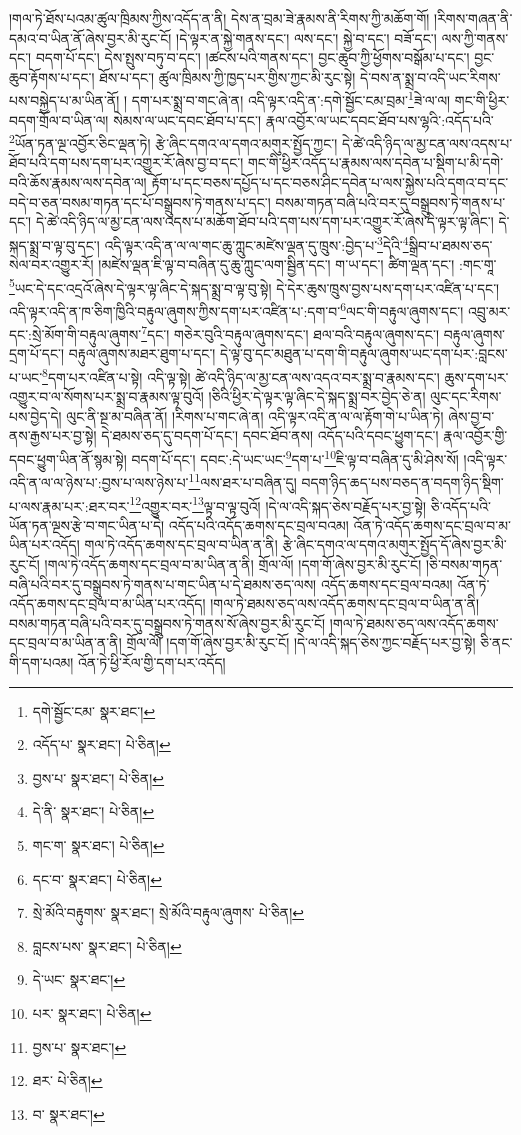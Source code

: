 །གལ་ཏེ་ཐོས་པའམ་ཚུལ་ཁྲིམས་ཀྱིས་འདོད་ན་ནི། དེས་ན་བྲམ་ཟེ་རྣམས་ནི་རིགས་ཀྱི་མཆོག་གོ། །རིགས་གཞན་ནི་དམའ་བ་ཡིན་ནོ་ཞེས་བྱར་མི་རུང་ངོ། །དེ་ལྟར་ན་སྐྱེ་གནས་དང་། ལས་དང་། སྐྱེ་བ་དང་། བཟོ་དང་། ལས་ཀྱི་གནས་དང་། བདག་པོ་དང་། དེས་སྤུས་བཏུ་བ་དང་། །ཚངས་པའི་གནས་དང་། བྱང་ཆུབ་ཀྱི་ཕྱོགས་བསྒོམ་པ་དང་། བྱང་ཆུབ་རྟོགས་པ་དང་། ཐོས་པ་དང་། ཚུལ་ཁྲིམས་ཀྱི་ཁྱད་པར་གྱིས་ཀྱང་མི་རུང་སྟེ། དེ་བས་ན་སྨྲ་བ་འདི་ཡང་རིགས་པས་བསྐྱེད་པ་མ་ཡིན་ནོ། །
དག་པར་སྨྲ་བ་གང་ཞེ་ན། འདི་ལྟར་འདི་ན་:དགེ་སྦྱོང་ངམ་བྲམ་\footnote{དགེ་སྦྱོང་ངམ་  སྣར་ཐང་། }ཟེ་ལ་ལ། གང་གི་ཕྱིར་བདག་གྲོལ་བ་ཡིན་ལ། སེམས་ལ་ཡང་དབང་ཐོབ་པ་དང་། རྣལ་འབྱོར་ལ་ཡང་དབང་ཐོབ་པས་ལྷའི་:འདོད་པའི་\footnote{འདོད་པ་  སྣར་ཐང་།  པེ་ཅིན། }ཡོན་ཏན་ལྔ་འབྱོར་ཅིང་ལྡན་ཏེ། རྩེ་ཞིང་དགའ་ལ་དགའ་མགུར་སྤྱོད་ཀྱང་། དེ་ཚེ་འདི་ཉིད་ལ་མྱ་ངན་ལས་འདས་པ་ཐོབ་པའི་དག་པས་དག་པར་འགྱུར་རོ་ཞེས་བྱ་བ་དང་། གང་གི་ཕྱིར་འདོད་པ་རྣམས་ལས་དབེན་པ་སྡིག་པ་མི་དགེ་བའི་ཆོས་རྣམས་ལས་དབེན་ལ། རྟོག་པ་དང་བཅས་དཔྱོད་པ་དང་བཅས་ཤིང་དབེན་པ་ལས་སྐྱེས་པའི་དགའ་བ་དང་བདེ་བ་ཅན་བསམ་གཏན་དང་པོ་བསྒྲུབས་ཏེ་གནས་པ་དང་། བསམ་གཏན་བཞི་པའི་བར་དུ་བསྒྲུབས་ཏེ་གནས་པ་དང་། དེ་ཚེ་འདི་ཉིད་ལ་མྱ་ངན་ལས་འདས་པ་མཆོག་ཐོབ་པའི་དག་པས་དག་པར་འགྱུར་རོ་ཞེས་དེ་ལྟར་ལྟ་ཞིང་། དེ་སྐད་སྨྲ་བ་ལྟ་བུ་དང་། འདི་ལྟར་འདི་ན་ལ་ལ་གང་ཆུ་ཀླུང་མཛེས་ལྡན་དུ་ཁྲུས་:བྱེད་པ་\footnote{བྱས་པ་  སྣར་ཐང་།  པེ་ཅིན། }དེའི་\footnote{དེ་ནི་  སྣར་ཐང་།  པེ་ཅིན། }སྒྲིབ་པ་ཐམས་ཅད་སེལ་བར་འགྱུར་རོ། །མཛེས་ལྡན་ཇི་ལྟ་བ་བཞིན་དུ་ཆུ་ཀླུང་ལག་སྦྱིན་དང་། ག་ཡ་དང་། ཚིག་ལྡན་དང་། :གང་གཱ་\footnote{གང་ག་  སྣར་ཐང་།  པེ་ཅིན། }ཡང་དེ་དང་འདྲའོ་ཞེས་དེ་ལྟར་ལྟ་ཞིང་དེ་སྐད་སྨྲ་བ་ལྟ་བུ་སྟེ། དེ་དེར་ཆུས་ཁྲུས་བྱས་པས་དག་པར་འཛིན་པ་དང་། འདི་ལྟར་འདི་ན་ཁ་ཅིག་ཁྱིའི་བརྟུལ་ཞུགས་ཀྱིས་དག་པར་འཛིན་པ་:དག་བ་\footnote{དང་བ་  སྣར་ཐང་།  པེ་ཅིན། }ལང་གི་བརྟུལ་ཞུགས་དང་། འབྲུ་མར་དང་:སྲེ་མོག་གི་བརྟུལ་ཞུགས་\footnote{སྲེ་མོའི་བརྟུགས་  སྣར་ཐང་། སྲེ་མོའི་བརྟུལ་ཞུགས་  པེ་ཅིན། }དང་། གཅེར་བུའི་བརྟུལ་ཞུགས་དང་། ཐལ་བའི་བརྟུལ་ཞུགས་དང་། བརྟུལ་ཞུགས་དྲག་པོ་དང་། བརྟུལ་ཞུགས་མཐར་ཐུག་པ་དང་། དེ་ལྟ་བུ་དང་མཐུན་པ་དག་གི་བརྟུལ་ཞུགས་ཡང་དག་པར་:བླངས་པ་ཡང་\footnote{བླངས་པས་  སྣར་ཐང་།  པེ་ཅིན། }དག་པར་འཛིན་པ་སྟེ། འདི་ལྟ་སྟེ། ཚེ་འདི་ཉིད་ལ་མྱ་ངན་ལས་འདའ་བར་སྨྲ་བ་རྣམས་དང་། ཆུས་དག་པར་འགྱུར་བ་ལ་སོགས་པར་སྨྲ་བ་རྣམས་ལྟ་བུའོ། །ཅིའི་ཕྱིར་དེ་ལྟར་ལྟ་ཞིང་དེ་སྐད་སྨྲ་བར་བྱེད་ཅེ་ན། ལུང་དང་རིགས་པས་བྱེད་དེ། ལུང་ནི་སྔ་མ་བཞིན་ནོ། །རིགས་པ་གང་ཞེ་ན། འདི་ལྟར་འདི་ན་ལ་ལ་རྟོག་གེ་པ་ཡིན་ཏེ། ཞེས་བྱ་བ་ནས་རྒྱས་པར་བྱ་སྟེ། དེ་ཐམས་ཅད་དུ་བདག་པོ་དང་། དབང་ཐོབ་ནས། འདོད་པའི་དབང་ཕྱུག་དང་། རྣལ་འབྱོར་གྱི་དབང་ཕྱུག་ཡིན་ནོ་སྙམ་སྟེ། བདག་པོ་དང་། དབང་:དེ་ཡང་ཡང་\footnote{དེ་ཡང་  སྣར་ཐང་། }དག་པ་\footnote{པར་  སྣར་ཐང་།  པེ་ཅིན། }ཇི་ལྟ་བ་བཞིན་དུ་མི་ཤེས་སོ། །འདི་ལྟར་འདི་ན་ལ་ལ་ཉེས་པ་:བྱས་པ་ལས་ཉེས་པ་\footnote{བྱས་པ་  སྣར་ཐང་། }ལས་ཐར་པ་བཞིན་དུ། བདག་ཉིད་ཆད་པས་བཅད་ན་བདག་ཉིད་སྡིག་པ་ལས་རྣམ་པར་:ཐར་བར་\footnote{ཐར་  པེ་ཅིན། }འགྱུར་བར་\footnote{བ་  སྣར་ཐང་། }ལྟ་བ་ལྟ་བུའོ། །དེ་ལ་འདི་སྐད་ཅེས་བརྗོད་པར་བྱ་སྟེ། ཅི་འདོད་པའི་ཡོན་ཏན་ལྔས་རྩེ་བ་གང་ཡིན་པ་དེ། འདོད་པའི་འདོད་ཆགས་དང་བྲལ་བའམ། འོན་ཏེ་འདོད་ཆགས་དང་བྲལ་བ་མ་ཡིན་པར་འདོད། གལ་ཏེ་འདོད་ཆགས་དང་བྲལ་བ་ཡིན་ན་ནི། རྩེ་ཞིང་དགའ་ལ་དགའ་མགུར་སྤྱོད་དོ་ཞེས་བྱར་མི་རུང་ངོ། །གལ་ཏེ་འདོད་ཆགས་དང་བྲལ་བ་མ་ཡིན་ན་ནི། གྲོལ་ལོ། །དག་གོ་ཞེས་བྱར་མི་རུང་ངོ། །ཅི་བསམ་གཏན་བཞི་པའི་བར་དུ་བསྒྲུབས་ཏེ་གནས་པ་གང་ཡིན་པ་དེ་ཐམས་ཅད་ལས། འདོད་ཆགས་དང་བྲལ་བའམ། འོན་ཏེ་འདོད་ཆགས་དང་བྲལ་བ་མ་ཡིན་པར་འདོད། །གལ་ཏེ་ཐམས་ཅད་ལས་འདོད་ཆགས་དང་བྲལ་བ་ཡིན་ན་ནི། བསམ་གཏན་བཞི་པའི་བར་དུ་བསྒྲུབས་ཏེ་གནས་སོ་ཞེས་བྱར་མི་རུང་ངོ། །གལ་ཏེ་ཐམས་ཅད་ལས་འདོད་ཆགས་དང་བྲལ་བ་མ་ཡིན་ན་ནི། གྲོལ་ལོ། །དག་གོ་ཞེས་བྱར་མི་རུང་ངོ། །དེ་ལ་འདི་སྐད་ཅེས་ཀྱང་བརྗོད་པར་བྱ་སྟེ། ཅི་ནང་གི་དག་པའམ། འོན་ཏེ་ཕྱི་རོལ་གྱི་དག་པར་འདོད། 